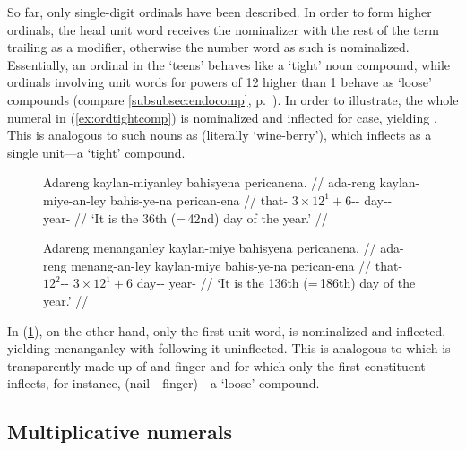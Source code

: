 So far, only single-digit ordinals have been described. In order to form higher
ordinals, the head unit word receives the nominalizer with the rest of the term
trailing as a modifier, otherwise the number word as such is nominalized.
Essentially, an ordinal in the `teens'
behaves like a `tight' noun compound, while ordinals involving unit words for
powers of 12 higher than 1 behave as `loose' compounds (compare
\autoref{subsubsec:endocomp}, p.~\pageref{loosecomp}). In order to illustrate,
the whole numeral  in (\ref{ex:ordtightcomp})
is nominalized and inflected for case, yielding
. This is analogous to such nouns as
 (literally `wine-berry'), which inflects
as a single unit---a `tight' compound.

\begin{figure}[h]
\pex
\a\label{ex:ordtightcomp}\begingl
	\gla Adareng kaylan-miyanley bahisyena pericanena. //
	\glb ada-reng kaylan-miye-an-ley bahis-ye-na perican-ena //
	\glc that-\AargI{} {$3 \times 12^1 + 6$-\Nmlz{}-\PargI{}} 
		day-\Pl{}-\Gen{} year-\Gen{} //
	\glft `It is the 36th (=\,42nd) day of the year.' //
\endgl

\a\label{ex:ordloosecomp}\begingl
	\gla Adareng menanganley kaylan-miye bahisyena pericanena. //
	\glb ada-reng menang-an-ley kaylan-miye bahis-ye-na perican-ena //
	\glc that-\AargI{} {$12^2$-\Nmlz{}-\PargI{}} {$3 \times 12^1 
		+ 6$} day-\Pl{}-\Gen{} year-\Gen{} //
	\glft `It is the 136th (=\,186th) day of the year.' //
\endgl
\xe
\end{figure}

In (\ref{ex:ordloosecomp}), on the other hand, only the first unit word,
 is nominalized and inflected, yielding 
{menanganley} with  following it uninflected.
This is analogous to  which is
transparently made up of  and 
{finger} and for which only the first constituent inflects, for instance,
 (nail-\Pl{}-\Gen{}
finger)---a `loose' compound.

\subsection{Multiplicative numerals}

